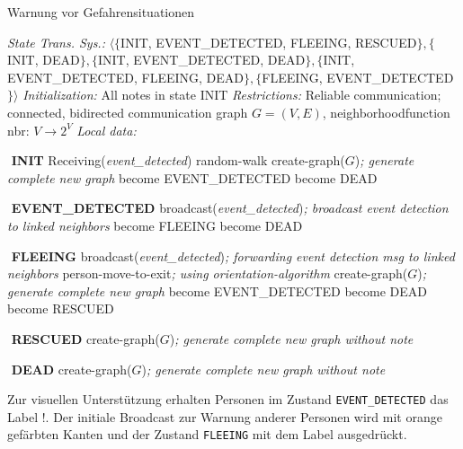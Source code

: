\begin{algorithm}
\caption{Warnung vor Gefahrensituationen}
\label{alg:event_detected}
\begin{algorithmic} 
\STATE \textit{State Trans. Sys.:} $\langle\{$INIT, EVENT{\_}DETECTED, FLEEING, RESCUED$\}, \{$INIT, DEAD$\}, \{$INIT, EVENT{\_}DETECTED, DEAD$\}, \{$INIT, EVENT{\_}DETECTED, FLEEING, DEAD$\}, \{$FLEEING, EVENT{\_}DETECTED$\}\rangle$
\STATE \textit{Initialization:} All notes in state INIT
\STATE \textit{Restrictions:} Reliable communication; connected, bidirected communication graph $G = (V,E)$, neighborhoodfunction nbr: $V \rightarrow 2^{V}$
\STATE \textit{Local data:}

\STATE $ $
\STATE \textbf{INIT}
\STATE Receiving(\textit{event{\_}detected})
\STATE random-walk
\STATE create-graph($G$)\hfill\emph{; generate complete new graph}
\ENDWHILE
\STATE become EVENT{\_}DETECTED
\STATE become DEAD
\ENDIF

\STATE $ $
\STATE \textbf{EVENT{\_}DETECTED}
\STATE broadcast(\textit{event{\_}detected})\hfill\emph{; broadcast event detection to linked neighbors}
\STATE become FLEEING
\STATE become DEAD
\ENDIF

\STATE $ $
\STATE \textbf{FLEEING}
\STATE broadcast(\textit{event{\_}detected})\hfill\emph{; forwarding event detection msg to linked neighbors}
\ENDIF
{}
\STATE person-move-to-exit\hfill\emph{; using orientation-algorithm}
\STATE create-graph($G$)\hfill\emph{; generate complete new graph}
\STATE become EVENT{\_}DETECTED
\ENDIF
{}
\STATE become DEAD
\ENDIF
\ENDWHILE
\STATE become RESCUED

\STATE $ $
\STATE \textbf{RESCUED}
\STATE create-graph($G$)\hfill\emph{; generate complete new graph without note}

\STATE $ $
\STATE \textbf{DEAD}
\STATE create-graph($G$)\hfill\emph{; generate complete new graph without note}

\end{algorithmic}
\end{algorithm}

Zur visuellen Unterstützung erhalten Personen im Zustand \verb|EVENT_DETECTED| das Label \glqq !{\grqq}. Der initiale Broadcast zur Warnung anderer Personen wird mit orange gefärbten Kanten und der Zustand \verb|FLEEING| mit dem Label \glqq *{\grqq} ausgedrückt.

